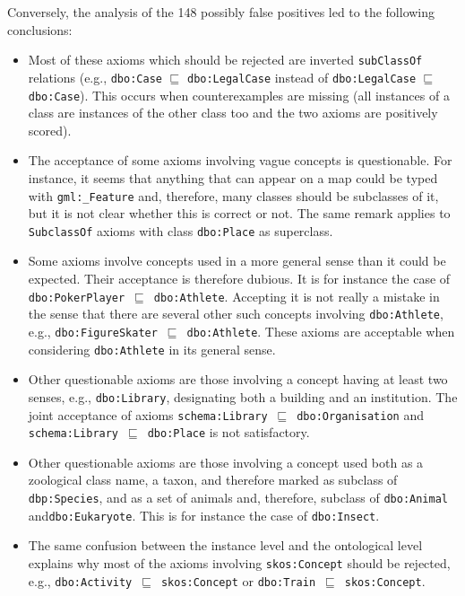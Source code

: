 \documentclass{llncs}
\begin{document}
Conversely, the analysis of the 148 possibly false positives led to the following conclusions:
\begin{itemize}
\item Most of these axioms which should be rejected are inverted \texttt{subClassOf} relations
(e.g., \texttt{dbo:Case} $\sqsubseteq$ \texttt{dbo:LegalCase} instead of \texttt{dbo:LegalCase} $\sqsubseteq$ \texttt{dbo:Case}).
This occurs when counterexamples are missing (all instances of a class are instances of the other class too and the two axioms are positively scored).

\item The acceptance of some axioms involving vague concepts is questionable.
For instance, it seems that anything that can appear on a map could be typed with
\texttt{gml:\_Feature} and, therefore, many classes should be subclasses of it,
but it is not clear whether this is correct or not.
The same remark applies to \texttt{SubclassOf} axioms with class \texttt{dbo:Place} as superclass.

\item Some axioms involve concepts used in a more general sense than it could be expected.
Their acceptance is therefore dubious. It is for instance the case of \texttt{dbo:PokerPlayer}~$\sqsubseteq$~\texttt{dbo:Athlete}. Accepting it is not really a mistake in the sense that there are several other such concepts involving \texttt{dbo:Athlete}, e.g., \texttt{dbo:FigureSkater}~$\sqsubseteq$~\texttt{dbo:Athlete}. These axioms are acceptable when considering \texttt{dbo:Athlete} in its general sense.

\item Other questionable axioms are those involving a concept having at least two senses, e.g., \texttt{dbo:Library}, designating both a building and an institution. The joint acceptance of axioms \texttt{schema:Library}~$\sqsubseteq$~\texttt{dbo:Organisation} and \texttt{schema:Library}~$\sqsubseteq$~\texttt{dbo:Place} is not satisfactory.

\item Other questionable axioms are those involving a concept used both as a zoological class name, a taxon, and therefore marked as subclass of \texttt{dbp:Species}, and as a set of animals and, therefore, subclass of \texttt{dbo:Animal} and\break\texttt{dbo:Eukaryote}.
This is for instance the case of \texttt{dbo:Insect}.

\item The same confusion between the instance level and the ontological level
explains why most of the axioms involving \texttt{skos:Concept} should be rejected,
e.g., \texttt{dbo:Activity}~$\sqsubseteq$~\texttt{skos:Concept} or
\texttt{dbo:Train}~$\sqsubseteq$~\texttt{skos:Concept}.


\end{itemize}
\end{document}
